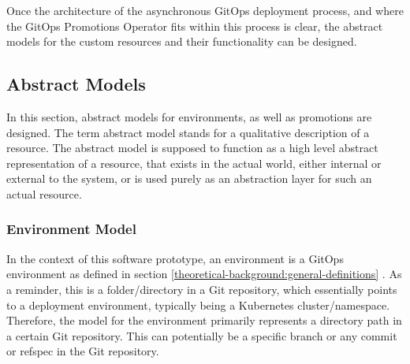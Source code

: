 %
%
%

Once the architecture of the asynchronous GitOps deployment process,
and where the GitOps Promotions Operator fits within this process is clear,
the abstract models for the custom resources and their functionality can be designed.






\subsection{Abstract Models}
\label{prototype:design:abstract-models}

In this section,
abstract models for environments, as well as promotions are designed.
The term abstract model stands for a qualitative description of a resource.
The abstract model is supposed to function as a high level abstract representation of a resource,
that exists in the actual world, either internal or external to the system,
or is used purely as an abstraction layer for such an actual resource.

\subsubsection*{Environment Model}

In the context of this software prototype,
an environment is a GitOps environment as defined in section
\ref{theoretical-background:general-definitions} .
As a reminder, this is a folder/directory in a Git repository,
which essentially points to a deployment environment, typically being a Kubernetes cluster/namespace.
Therefore, the model for the environment primarily represents a directory path in a certain Git repository.
This can potentially be a specific branch or any commit or refspec in the Git repository.

